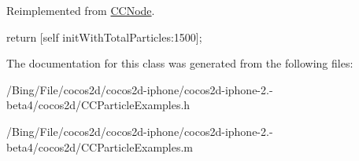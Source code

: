 Reimplemented from \hyperlink{class_c_c_node_ad789cad83aca65c130abd4452d1bc081}{C\-C\-Node}.


\begin{DoxyCode}
{
        return [self initWithTotalParticles:1500];
}
\end{DoxyCode}


The documentation for this class was generated from the following files\-:\begin{DoxyCompactItemize}
\item 
/\-Bing/\-File/cocos2d/cocos2d-\/iphone/cocos2d-\/iphone-\/2.-\/beta4/cocos2d/C\-C\-Particle\-Examples.\-h\item 
/\-Bing/\-File/cocos2d/cocos2d-\/iphone/cocos2d-\/iphone-\/2.-\/beta4/cocos2d/C\-C\-Particle\-Examples.\-m\end{DoxyCompactItemize}
